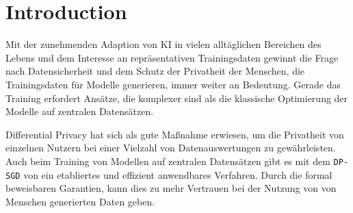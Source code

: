 \chapter{Introduction}

Mit der zunehmenden Adaption von KI in vielen alltäglichen Bereichen des Lebens und dem Interesse an repräsentativen Trainingsdaten gewinnt die Frage nach Datensicherheit und dem Schutz der Privatheit der Menschen, die Trainingsdaten für Modelle generieren, immer weiter an Bedeutung. Gerade das Training erfordert Ansätze, die komplexer sind als die klassische Optimierung der Modelle auf zentralen Datensätzen.

Differential Privacy hat sich als gute Maßnahme erwiesen, um die Privatheit von einzelnen Nutzern bei einer Vielzahl von Datenauswertungen zu gewährleisten. Auch beim Training von Modellen auf zentralen Datensätzen gibt es mit dem \texttt{DP-SGD} von \textcite{abadi:2016} ein etabliertes und effizient anwendbares Verfahren. Durch die formal beweisbaren Garantien, kann dies zu mehr Vertrauen bei der Nutzung von von Menschen generierten Daten geben.

